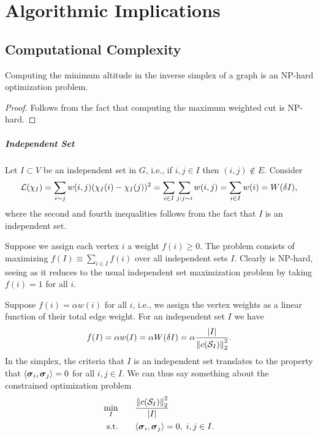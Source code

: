 \chapter{Algorithmic Implications}

\section{Computational Complexity}

\begin{corollary}
	Computing the minimum altitude in the inverse simplex of a graph is an NP-hard optimization problem. 
\end{corollary}
\begin{proof}
	Follows from the fact that computing the maximum weighted cut is NP-hard. 
\end{proof}


\paragraph{Independent Set}
Let $I\subset V$ be an independent set in $G$, i.e., if $i,j\in I$ then $(i,j)\notin E$. Consider 
\begin{align*}
    \mathcal{L}(\chi_I) = \sum_{i\sim j}w(i,j)(\chi_I(i)-\chi_I(j))^2 = \sum_{i\in I}\sum_{j:j\sim i} w(i,j) = \sum_{i\in I}w(i)=W(\delta I),
\end{align*}
where the second and fourth inequalities follows from the fact that $I$ is an independent set. 

Suppose we assign each vertex $i$ a weight $f(i)\geq 0$. The \mwis problem consists of maximizing $f(I)\equiv \sum_{i\in I}f(i)$ over all independent sets $I$. Clearly \mwis is NP-hard, seeing as it reduces to the usual independent set maximization problem by taking $f(i)=1$ for all $i$. 

Suppose $f(i)=\alpha w(i)$ for all $i$, i.e., we assign the vertex weights as a linear function of their total edge weight. For an independent set $I$ we have 
\begin{align*}
    f(I) = \alpha w(I)= \alpha W(\delta I) = \alpha \frac{|I|}{\norm{c(\mathcal{S}_I)}_2^2}.
\end{align*}
In the simplex, the criteria that $I$ is an independent set translates to the property that $\langle \vb*{\sigma}_i,\vb*{\sigma}_j\rangle =0$ for all $i,j\in I$. We can thus say something \TODO {} about the constrained optimization problem 
\begin{alignat*}{2}
    \min_I & \quad && \frac{\norm{c(\mathcal{S}_I)}_2^2}{|I|} \\
    \text{s.t.} & && \langle \vb*{\sigma}_i,\vb*{\sigma}_j\rangle =0, \;i,j\in I.
\end{alignat*}

